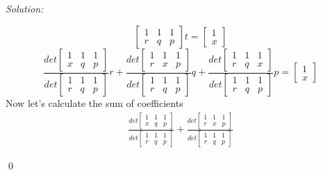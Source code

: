 \documentclass[a4paper, 8pt, oneside]{article}
\newenvironment{sol}
    {\emph{Solution:}
    }
    {
    \qed
    }
\begin{document}
\begin{enumerate}
\begin{enumerate}
\begin{sol}
\begin{equation*}
\begin{bmatrix}
    1 & 1 & 1\\
    r &q & p
\end{bmatrix} t = \begin{bmatrix}
    1 \\ x
\end{bmatrix}
\end{equation*}
\begin{equation*}
\frac{det \begin{bmatrix}
    1 & 1 & 1\\
    x &q & p
\end{bmatrix}}{det \begin{bmatrix}
    1 & 1 & 1\\
    r &q & p
\end{bmatrix}} r +
\frac{det \begin{bmatrix}
    1 & 1 & 1\\
    r &x & p
\end{bmatrix}}{det \begin{bmatrix}
    1 & 1 & 1\\
    r &q & p
\end{bmatrix}} q +
\frac{det \begin{bmatrix}
    1 & 1 & 1\\
    r &q & x
\end{bmatrix}}{det \begin{bmatrix}
    1 & 1 & 1\\
    r &q & p
\end{bmatrix}} p = \begin{bmatrix}
    1 \\ x
\end{bmatrix}
\end{equation*}
Now let's calculate the sum of coefficients
\begin{align*}
\frac{det \begin{bmatrix}
    1 & 1 & 1\\
    x &q & p
\end{bmatrix}}{det \begin{bmatrix}
    1 & 1 & 1\\
    r &q & p
\end{bmatrix}} +
\frac{det \begin{bmatrix}
    1 & 1 & 1\\
    r &x & p
\end{bmatrix}}{det \begin{bmatrix}
    1 & 1 & 1\\
    r &q & p

\end{bmatrix}}
\end{align*}
\end{sol}
\end{enumerate}
\end{enumerate}
\end{document}
